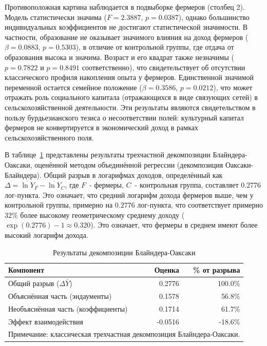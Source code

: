 \documentclass[14pt, a4paper]{article}
\begin{document}
	Противоположная картина наблюдается в подвыборке фермеров (столбец 2). Модель статистически значима ($F = 2.3887$, $p = 0.0387$), однако большинство индивидуальных коэффициентов не достигают статистической значимости. В частности, образование не оказывает значимого влияния на доход фермеров ($\beta = 0.0883$, $p = 0.5303$), в отличие от контрольной группы, где отдача от образования высока и значима. Возраст и его квадрат также незначимы ($p = 0.7822$ и $p = 0.8491$ соответственно), что свидетельствует об отсутствии классического профиля накопления опыта у фермеров. Единственной значимой переменной остается семейное положение ($\beta = 0.3586$, $p = 0.0212$), что может отражать роль социального капитала (отражающихся в виде связующих сетей) в сельскохозяйственной деятельности. Эти результаты являются свидетельством в пользу бурдьезианского тезиса о несоответствии полей: культурный капитал фермеров не конвертируется в экономический доход в рамках сельскохозяйственного поля.
	
	В таблице~\ref{tab:oaxaca_results} представлены результаты трехчастной декомпозиции Блайндера-Оаксаки, оценённой методом объединённой регрессии (декомпозиция Оаксаки-Блайндера). Общий разрыв в логарифмах доходов, определённый как \(\Delta=\overline{\ln Y}_F-\overline{\ln Y}_C\), где \(F\)~- фермеры, \(C\)~- контрольная группа, составляет \(0.2776\) лог-пункта.
	Это означает, что средний логарифм дохода фермеров выше, чем у контрольной группы, примерно на \(0.2776\) лог-пункта, что соответствует примерно \(32\%\) более высокому геометрическому среднему доходу (\(\exp(0.2776)-1\approx 0.320\)).
	Это означает, что фермеры в среднем имеют более высокий логарифм дохода. 
	
	\begin{table}[htbp]
		\centering
		\caption{Результаты декомпозиции Блайндера-Оаксаки}
		\label{tab:oaxaca_results}
		\begin{tabular}{lrr}
			\toprule\toprule
			Компонент & Оценка & \% от разрыва \\
			\midrule
			Общий разрыв (\(\Delta \bar{Y}\)) & 0.2776 & 100.0\% \\
			\midrule
			Объяснённая часть (эндаументы) & 0.1578 & 56.8\% \\
			Необъяснённая часть (коэффициенты) & 0.1714 & 61.7\% \\
			Эффект взаимодействия & -0.0516 & -18.6\% \\
			\bottomrule
			\multicolumn{3}{l}{\footnotesize Примечание: классическая трехчастная
				декомпозиция Блайндера-Оаксаки.} \\
		\end{tabular}
	\end{table}
	
\end{document}
